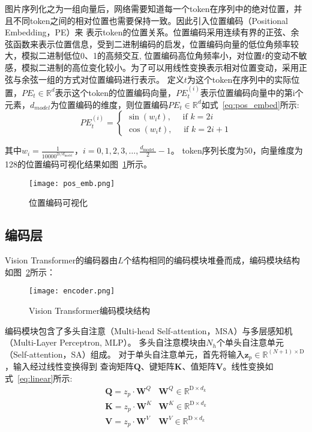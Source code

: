 图片序列化之为一组向量后，网络需要知道每一个token在序列中的绝对位置，并且不同token之间的相对位置也需要保持一致。因此引入位置编码（Positional Embedding，PE）来
表示token的位置关系。位置编码采用连续有界的正弦、余弦函数来表示位置信息，受到二进制编码的启发，位置编码向量的低位角频率较大，模拟二进制低位0、1的高频交互,
位置编码高位角频率小，对位置$t$的变动不敏感，模拟二进制的高位变化较小。为了可以用线性变换表示相对位置变动，采用正弦与余弦一组的方式对位置编码进行表示。
定义$t$为这个token在序列中的实际位置，$P E_{t} \in \mathbb{R}^{d}$表示这个token的位置编码向量，$P E_{t}^{(i)}$表示位置编码向量中的第i个
元素，$d_{model}$为位置编码的维度，则位置编码$P E_{t} \in \mathbb{R}^{d}$如式~\ref{eq:pos_embed}所示:
\begin{equation}
  P E_{t}^{(i)}=\left\{\begin{array}{l}
  \sin \left(w_{i} t\right), \quad \text { if } k=2 i \\
  \cos \left(w_{i} t\right), \quad \text { if } k=2 i+1
  \end{array}\right.
  \label{eq:pos_embed}
\end{equation}

其中$w_{i}=\frac{1}{10000^{2 i / d_{\text {model }}}}$，$i=0,1,2,3, \ldots, \frac{d_{\text {model }}}{2}-1$。
token序列长度为50，向量维度为128的位置编码可视化结果如图~\ref{fig:pos_embed}所示。
\begin{figure} 
   \centering   
   \texttt{[image: pos\_emb.png]}   
   \caption{位置编码可视化}   
   \label{fig:pos_embed} 
\end{figure}  

\subsection{编码层}
Vision Transformer的编码器由$L$个结构相同的编码模块堆叠而成，编码模块结构如图~\ref{fig:encoder}所示：
\begin{figure} 
   \centering   
   \texttt{[image: encoder.png]}   
   \caption{Vision Transformer编码模块结构}   
   \label{fig:encoder} 
\end{figure}  

编码模块包含了多头自注意（Multi-head Self-attention，MSA）与多层感知机（Multi-Layer Perceptron, MLP）。
多头自注意模块由$N_h$个单头自注意单元（Self-attention，SA）组成。
对于单头自注意单元，首先将输入$\mathbf{z}_{p} \in \mathbb{R}^{(N+1) \times \mathrm{D}}$，输入经过线性变换得到
查询矩阵$\boldsymbol{Q}$、键矩阵$\boldsymbol{K}$、值矩阵$\boldsymbol{V}$。线性变换如式~\ref{eq:linear}所示:
\begin{equation}
  \begin{array}{ll}
  \boldsymbol{Q}=z_{p} \cdot \boldsymbol{W}^{Q} & \boldsymbol{W}^{Q} \in \mathbb{R}^{\mathrm{D} \times d_{k}} \\
  \boldsymbol{K}=z_{p} \cdot \boldsymbol{W}^{K} & \boldsymbol{W}^{K} \in \mathbb{R}^{\mathrm{D} \times d_{k}} \\
  \boldsymbol{V}=z_{p} \cdot \boldsymbol{W}^{V} & \boldsymbol{W}^{V} \in \mathbb{R}^{\mathrm{D} \times d_{k}}
  \end{array}
  \label{eq:linear}
\end{equation}

